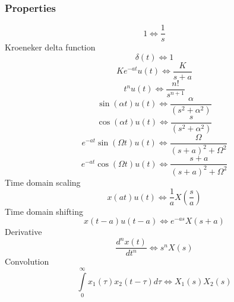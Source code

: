 \documentclass{article}
\begin{document}
		\subsubsection{Properties}
			\begin{equation}
				1 \Leftrightarrow \frac{1}{{s}}
			\end{equation}
			Kroeneker delta function
			\begin{equation}
				\delta (t) \Leftrightarrow 1
			\end{equation}
			\begin{equation}
				Ke^{ - at} u(t) \Leftrightarrow \frac{K}{{s + a}}			
			\end{equation}
			\begin{equation}
				t^n u(t) \Leftrightarrow \frac{{n!}}{{s^{n + 1} }}
			\end{equation}
			\begin{equation}
				\sin (\alpha t)u(t) \Leftrightarrow \frac{\alpha }{{(s^2 + \alpha ^2 )}}
			\end{equation}
			\begin{equation}
				\cos (\alpha t)u(t) \Leftrightarrow \frac{s}{{(s^2 + \alpha ^2 )}}
			\end{equation}
			\begin{equation}
			e^{ - at} \sin (\Omega t)u(t) \Leftrightarrow \frac{\Omega }{{(s + a)^2 + \Omega ^2 }}
			\end{equation}
			\begin{equation}
				e^{ - at} \cos (\Omega t)u(t) \Leftrightarrow \frac{{s + a}}{{(s + a)^2 + \Omega ^2 }}
			\end{equation}
			Time domain scaling
			\begin{equation}
				x(at)u(t) \Leftrightarrow \frac{1}{a}X\left( {\frac{s}{a}} \right)
			\end{equation}
			Time domain shifting 
			\begin{equation}
				x(t - a)u(t - a) \Leftrightarrow e^{ - as} X(s + a)
			\end{equation}
			Derivative
			\begin{equation}
				\frac{{d^n x(t)}}{{dt^n }} \Leftrightarrow s^n X(s)			
			\end{equation}
			Convolution
			\begin{equation}
			\int\limits_0^\infty {x_1 (\tau )x_2 (t - \tau )d\tau } \Leftrightarrow X_1 (s)X_2 (s)
			\end{equation}
\end{document}
